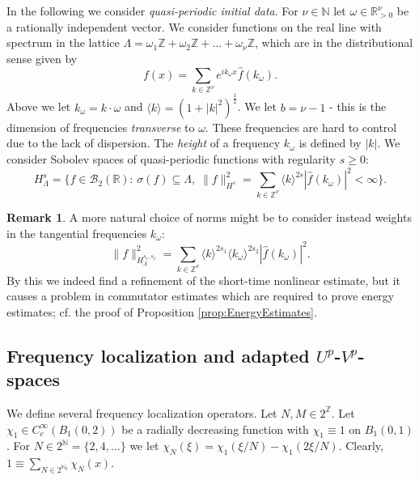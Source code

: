 \documentclass{amsart}
\theoremstyle{definition}
\newtheorem{remark}[theorem]{Remark}
\newcommand{\R}{\mathbb{R}}
\newcommand{\N}{\mathbb{N}}
\newcommand{\Z}{\mathbb{Z}}
\begin{document}
In the following we consider \emph{quasi-periodic initial data}. For $\nu \in \N$ let $\omega \in \R^{\nu}_{>0}$ be a rationally independent vector. We consider functions on the real line with spectrum in the lattice $\Lambda = \omega_1 \Z + \omega_2 \Z + \ldots + \omega_{\nu} \Z$, which are in the distributional sense given by
\begin{equation*}
	f(x) = \sum_{k \in \Z^{\nu}} e^{i k_{\omega} x} \hat{f}(k_{\omega}).
\end{equation*}
Above we let $k_{\omega} = k \cdot \omega$ and $\langle k \rangle = (1+|k|^2)^{\frac{1}{2}}$. We let $b=\nu-1$ - this is the dimension of frequencies \emph{transverse} to $\omega$. These frequencies are hard to control due to the lack of dispersion. The \emph{height} of a frequency $k_\omega$ is defined by $|k|$. We consider Sobolev spaces of quasi-periodic functions with regularity $s \geq 0$:
\begin{equation*}
	H^{s}_{\Lambda} = \{ f \in \mathcal{B}_2(\R) : \, \sigma(f) \subseteq \Lambda, \; \| f \|^2_{H^s} = \sum_{k \in \Z^{\nu}}  \langle k \rangle^{2s} |\hat{f}(k_{\omega} )|^2 < \infty \}.
\end{equation*}

\begin{remark}
	A more natural choice of norms might be to consider instead weights in the tangential frequencies $k_{\omega}$:
	\begin{equation*}
		\| f \|_{H^{s_1,s_2}_{\Lambda}}^2 = \sum_{k \in \Z^{\nu}} \langle k \rangle^{2 s_1} \langle k_\omega \rangle^{2 s_2} |\hat{f}(k_\omega)|^2.
	\end{equation*}
	By this we indeed find a refinement of the short-time nonlinear estimate, but it causes a problem in commutator estimates which are required to prove energy estimates; cf. the proof of Proposition \ref{prop:EnergyEstimates}.
\end{remark}

\subsection{Frequency localization and adapted $U^p$-$V^p$-spaces}

We define several frequency localization operators.
Let $N,M \in 2^{\Z}$. Let $\chi_1 \in C^\infty_c(B_1(0,2))$ be a radially decreasing function with $\chi_1 \equiv 1$ on $B_1(0,1)$. For $N \in 2^{\N} = \{2,4,\ldots \}$ we let $\chi_N(\xi) = \chi_1(\xi / N) - \chi_1(2 \xi/N)$. Clearly, $1 \equiv \sum_{N \in 2^{\N_0}} \chi_N(x)$.
\end{document}
